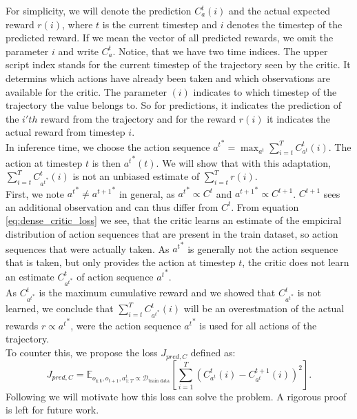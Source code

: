 For simplicity, we will denote the prediction 
$C_a^t(i)$ and the actual expected reward $r(i)$, where $t$ is the current timestep and $i$ denotes the timestep of the predicted reward. If we mean the vector of all predicted rewards, we omit the 
parameter $i$ and write $C_a^t$. Notice, that we have two time indices. The upper script index stands for the current timestep of the trajectory seen by the critic. 
It determins which actions have already been taken and 
which observations are available for the critic. The parameter $(i)$ indicates to which timestep of the trajectory the value belongs to. So for predictions, it indicates the prediction of the $i'th$ 
reward from the trajectory and for the reward $r(i)$ it indicates the actual reward from timestep $i$.\\ 
In inference time, we choose the action sequence 
${a^t}^* = \max_{a^t} \sum_{i=t}^T C_{a^t}^t(i)$. The action at timestep $t$ is then ${a^t}^*(t)$. We will show that with this adaptation, $\sum_{i=t}^T C_{{a^t}^*}^t(i)$ is not an unbiased estimate of 
$\sum_{i=t}^T r(i)$.\\
First, we note ${a^t}^* \neq {a^{t+1}}^*$ in general, as ${a^t}^* \propto C^t$ and ${a^{t+1}}^* \propto C^{t+1}$. $C^{t+1}$ sees an additional observation and can thus differ from $C^{t}$. 
From equation \ref{eq:dense_critic_loss} we see, that the critic learns an estimate of the empiciral distribution of action sequences that are present in the train dataset, so action sequences that 
were actually taken. As ${a^t}^*$ is generally not the action sequence that is taken, but only provides the action at timestep $t$, the critic does not learn an estimate $C_{{a^t}^*}^t$ of action sequence 
${a^t}^*$. \\
As $C_{{a^t}^*}^t$ is the maximum cumulative reward and we showed that $C_{{a^t}^*}^t$ is not learned, we conclude that $\sum_{i=t}^T C_{{a^t}^*}^t(i)$ 
will be an overestmation of the actual rewards $r \propto {a^t}^*$, were the action sequence ${a^t}^*$ is used for all actions of the trajectory. \\

To counter this, we propose the loss $J_{pred, C}$ defined as:
\begin{equation}
    \label{proxy_loss_dense}
    J_{pred, C} = \mathbb{E}_{o_{\textbf{1:t}} , o_{t+1}, a^t_{1:T} \propto \mathcal{D}_{\text{train data}}}\left[ \sum_{i=1}^T(C_{{a^t}}^t(i) - C_{{a^t}}^{t+1}(i))^2 \right].
\end{equation}
Following we will motivate how this loss can solve the problem. A rigorous proof 
is left for future work.\\

